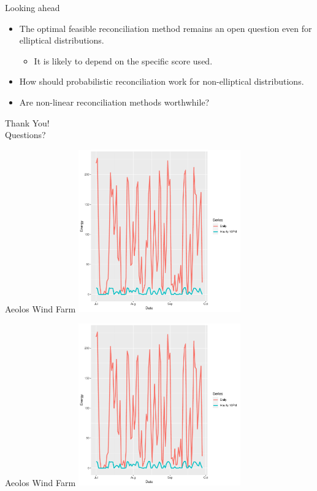 \documentclass{beamer}
\begin{document}
   \begin{frame}{Looking ahead}\label{simdisc}
     \begin{itemize}
     	\item The optimal feasible reconciliation method remains an open question even for elliptical distributions.
     	\pause
     	\begin{itemize}
     		\item It is likely to depend on the specific score used.
     	\end{itemize}
        \pause
        \item How should probabilistic reconciliation work for non-elliptical distributions.
        \pause
        \item Are non-linear reconciliation methods worthwhile?
     \end{itemize}	
   \end{frame}
  \begin{frame}
    \Huge{Thank You!}\\
  \pause\Huge{Questions?}
  \end{frame}
  \begin{frame}{Aeolos Wind Farm}\label{aelos}
  \centering
  \includegraphics[height=7cm]{Figs/Aeolos_Unscaled}
  \end{frame}
  \begin{frame}{Aeolos Wind Farm}
  \centering
  \includegraphics[height=7cm]{Figs/Aeolos_Unscaled}
  \end{frame}
\end{document}
